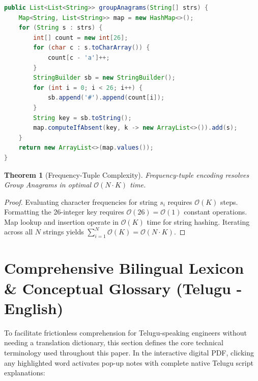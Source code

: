\documentclass[10pt,twocolumn,letterpaper]{article}
\newtheorem{theorem}{Theorem}
\begin{document}
\begin{lstlisting}[language=Java,caption={Optimal Linear-Time Anagram Grouping}]
public List<List<String>> groupAnagrams(String[] strs) {
    Map<String, List<String>> map = new HashMap<>();
    for (String s : strs) {
        int[] count = new int[26];
        for (char c : s.toCharArray()) {
            count[c - 'a']++;
        }
        StringBuilder sb = new StringBuilder();
        for (int i = 0; i < 26; i++) {
            sb.append('#').append(count[i]);
        }
        String key = sb.toString();
        map.computeIfAbsent(key, k -> new ArrayList<>()).add(s);
    }
    return new ArrayList<>(map.values());
}
\end{lstlisting}

\begin{theorem}[Frequency-Tuple Complexity]
Frequency-tuple encoding resolves Group Anagrams in optimal $\mathcal{O}(N \cdot K)$ time.
\end{theorem}

\begin{proof}
Evaluating character frequencies for string $s_i$ requires $\mathcal{O}(K)$ steps. Formatting the 26-integer key requires $\mathcal{O}(26) = \mathcal{O}(1)$ constant operations. Map lookup and insertion operate in $\mathcal{O}(K)$ time for string hashing. Iterating across all $N$ strings yields $\sum_{i=1}^N \mathcal{O}(K) = \mathcal{O}(N \cdot K)$.
\end{proof}

\section{Comprehensive Bilingual Lexicon \& Conceptual Glossary (Telugu - English)}
\label{sec:lexicon}

To facilitate frictionless comprehension for Telugu-speaking engineers without needing a translation dictionary, this section defines the core technical terminology used throughout this paper. In the interactive digital PDF, clicking any highlighted word activates pop-up notes with complete native Telugu script explanations:
\end{document}
